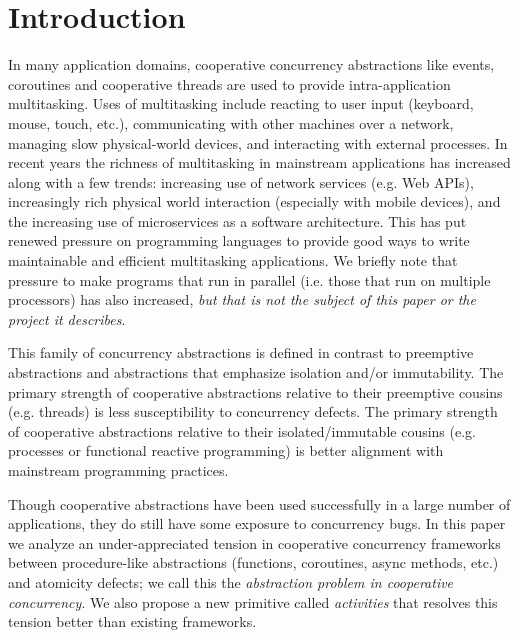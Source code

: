 \documentclass[9pt,preprint]{sigplanconf}
\begin{document}




\section{Introduction}

In many application domains, cooperative concurrency abstractions like events, coroutines and cooperative threads are used to provide intra-application multitasking.
Uses of multitasking include reacting to user input (keyboard, mouse, touch, etc.), communicating with other machines over a network, managing slow physical-world devices, and interacting with external processes.
In recent years the richness of multitasking in mainstream applications has increased along with a few trends: increasing use of network services (e.g. Web APIs), increasingly rich physical world interaction (especially with mobile devices), and the increasing use of microservices as a software architecture.
This has put renewed pressure on programming languages to provide good ways to write maintainable and efficient multitasking applications.
We briefly note that pressure to make programs that run in parallel (i.e. those that run on multiple processors) has also increased, \emph{but that is not the subject of this paper or the project it describes}.

This family of concurrency abstractions is defined in contrast to preemptive abstractions and abstractions that emphasize isolation and/or immutability.
The primary strength of cooperative abstractions relative to their preemptive cousins (e.g. threads) is less susceptibility to concurrency defects.
The primary strength of cooperative abstractions relative to their isolated/immutable cousins (e.g. processes or functional reactive programming) is better alignment with mainstream programming practices.

Though cooperative abstractions have been used successfully in a large number of applications, they do still have some exposure to concurrency bugs.
In this paper we analyze an under-appreciated tension in cooperative concurrency frameworks between procedure-like abstractions (functions, coroutines, async methods, etc.) and atomicity defects; we call this the \emph{abstraction problem in cooperative concurrency}.
We also propose a new primitive called \emph{activities} that resolves this tension better than existing frameworks.
\end{document}

